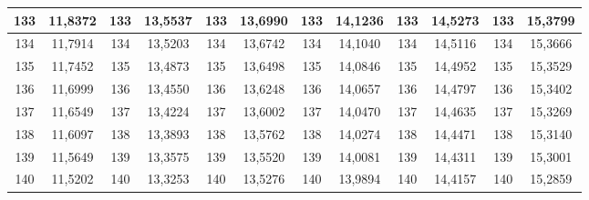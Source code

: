 \documentclass[a4paper,12pt]{article} %
\begin{document}
\begin{longtable}[c]{cccccccccc|c|c|}
	\multicolumn{1}{|c|}{133} & \multicolumn{1}{c|}{11,8372} & \multicolumn{1}{c|}{133} & \multicolumn{1}{c|}{13,5537} & \multicolumn{1}{c|}{133} & \multicolumn{1}{c|}{13,6990} & \multicolumn{1}{c|}{133} & \multicolumn{1}{c|}{14,1236} & \multicolumn{1}{c|}{133} & 14,5273 & 133 & 15,3799 \\ \hline
	\multicolumn{1}{|c|}{134} & \multicolumn{1}{c|}{11,7914} & \multicolumn{1}{c|}{134} & \multicolumn{1}{c|}{13,5203} & \multicolumn{1}{c|}{134} & \multicolumn{1}{c|}{13,6742} & \multicolumn{1}{c|}{134} & \multicolumn{1}{c|}{14,1040} & \multicolumn{1}{c|}{134} & 14,5116 & 134 & 15,3666 \\ \hline
	\multicolumn{1}{|c|}{135} & \multicolumn{1}{c|}{11,7452} & \multicolumn{1}{c|}{135} & \multicolumn{1}{c|}{13,4873} & \multicolumn{1}{c|}{135} & \multicolumn{1}{c|}{13,6498} & \multicolumn{1}{c|}{135} & \multicolumn{1}{c|}{14,0846} & \multicolumn{1}{c|}{135} & 14,4952 & 135 & 15,3529 \\ \hline
	\multicolumn{1}{|c|}{136} & \multicolumn{1}{c|}{11,6999} & \multicolumn{1}{c|}{136} & \multicolumn{1}{c|}{13,4550} & \multicolumn{1}{c|}{136} & \multicolumn{1}{c|}{13,6248} & \multicolumn{1}{c|}{136} & \multicolumn{1}{c|}{14,0657} & \multicolumn{1}{c|}{136} & 14,4797 & 136 & 15,3402 \\ \hline
	\multicolumn{1}{|c|}{137} & \multicolumn{1}{c|}{11,6549} & \multicolumn{1}{c|}{137} & \multicolumn{1}{c|}{13,4224} & \multicolumn{1}{c|}{137} & \multicolumn{1}{c|}{13,6002} & \multicolumn{1}{c|}{137} & \multicolumn{1}{c|}{14,0470} & \multicolumn{1}{c|}{137} & 14,4635 & 137 & 15,3269 \\ \hline
	\multicolumn{1}{|c|}{138} & \multicolumn{1}{c|}{11,6097} & \multicolumn{1}{c|}{138} & \multicolumn{1}{c|}{13,3893} & \multicolumn{1}{c|}{138} & \multicolumn{1}{c|}{13,5762} & \multicolumn{1}{c|}{138} & \multicolumn{1}{c|}{14,0274} & \multicolumn{1}{c|}{138} & 14,4471 & 138 & 15,3140 \\ \hline
	\multicolumn{1}{|c|}{139} & \multicolumn{1}{c|}{11,5649} & \multicolumn{1}{c|}{139} & \multicolumn{1}{c|}{13,3575} & \multicolumn{1}{c|}{139} & \multicolumn{1}{c|}{13,5520} & \multicolumn{1}{c|}{139} & \multicolumn{1}{c|}{14,0081} & \multicolumn{1}{c|}{139} & 14,4311 & 139 & 15,3001 \\ \hline
	\multicolumn{1}{|c|}{140} & \multicolumn{1}{c|}{11,5202} & \multicolumn{1}{c|}{140} & \multicolumn{1}{c|}{13,3253} & \multicolumn{1}{c|}{140} & \multicolumn{1}{c|}{13,5276} & \multicolumn{1}{c|}{140} & \multicolumn{1}{c|}{13,9894} & \multicolumn{1}{c|}{140} & 14,4157 & 140 & 15,2859 \\ \hline

\end{longtable}
\end{document}
